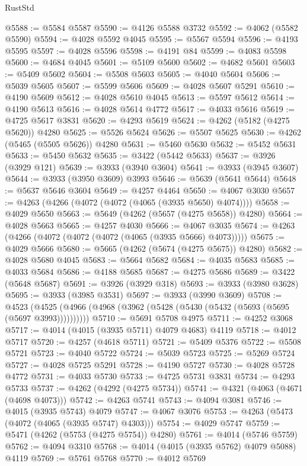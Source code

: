 \begin{lexlean}{RustStd}
\begin{coremodule}
@5588 := @5584 @5587
@5590 := @4126 @5588 @3732
@5592 := @4062 (@5582 @5590)
@5594 := @4028 @5592 @4045
@5595 := @5567 @5594
@5596 := @4193 @5595
@5597 := @4028 @5596
@5598 := @4191 @84
@5599 := @4083 @5598
@5600 := @4684 @4045
@5601 := @5109 @5600
@5602 := @4682 @5601
@5603 := @5409 @5602
@5604 := @5508 @5603
@5605 := @4040 @5604
@5606 := @5039 @5605
@5607 := @5599 @5606
@5609 := @4028 @5607 @5291
@5610 := @4190 @5609
@5612 := @4028 @5610 @4045
@5613 := @5597 @5612
@5614 := @4190 @5613
@5616 := @4028 @5614 @4772
@5617 := @4033 @5616
@5619 := @4725 @5617 @3831
@5620 := @4293 @5619
@5624 := @4262 (@5182 (@4275 @5620)) @4280
@5625 := @5526 @5624
@5626 := @5507 @5625
@5630 := @4262 (@5465 (@5505 @5626)) @4280
@5631 := @5460 @5630
@5632 := @5452 @5631
@5633 := @5450 @5632
@5635 := @3422 (@5442 @5633)
@5637 := @3926 (@3929 @121)
@5639 := @3933 (@3940 @3604)
@5641 := @3933 (@3945 @3607)
@5644 := @3933 (@3950 @3609) @3993
@5646 := @5639 (@5641 @5644)
@5648 := @5637 @5646 @3604
@5649 := @4257 @4464
@5650 := @4067 @3030
@5657 := @4263 (@4266 (@4072 (@4072 (@4065 (@3935 @5650) @4074))))
@5658 := @4029 @5650
@5663 := @5649 (@4262 (@5657 (@4275 @5658)) @4280)
@5664 := @4028 @5663
@5665 := @4257 @4030
@5666 := @4067 @3035
@5674 := @4263 (@4266 (@4072 (@4072 (@4072 (@4065 (@3935 @5666) @4073)))))
@5675 := @4029 @5666
@5680 := @5665 (@4262 (@5674 (@4275 @5675)) @4280)
@5682 := @4028 @5680 @4045
@5683 := @5664 @5682
@5684 := @4035 @5683
@5685 := @4033 @5684
@5686 := @4188 @5685
@5687 := @4275 @5686
@5689 := @3422 (@5648 @5687)
@5691 := @3926 (@3929 @318)
@5693 := @3933 (@3980 @3628)
@5695 := @3933 (@3985 @3531)
@5697 := @3933 (@3990 @3609)
@5708 := @4523 (@4525 (@4966 (@4968 (@3962 (@5428 (@5430 (@5432 (@5693 (@5695 (@5697 @3993))))))))))
@5710 := @5691 @5708 @4975
@5711 := @4252 @3068
@5717 := @4014 (@4015 (@3935 @5711) @4079 @4683) @4119
@5718 := @4012 @5717
@5720 := @4257 (@4618 @5711)
@5721 := @5409 @5376
@5722 := @5508 @5721
@5723 := @4040 @5722
@5724 := @5039 @5723
@5725 := @5269 @5724
@5727 := @4028 @5725 @5291
@5728 := @4190 @5727
@5730 := @4028 @5728 @4772
@5731 := @4033 @5730
@5733 := @4725 @5731 @3831
@5734 := @4293 @5733
@5737 := @4262 (@4292 (@4275 @5734))
@5741 := @4321 (@4063 (@4671 (@4698 @4073)))
@5742 := @4263 @5741
@5743 := @4094 @3081
@5746 := @4015 (@3935 @5743) @4079
@5747 := @4067 @3076
@5753 := @4263 (@5473 (@4072 (@4065 (@3935 @5747) @4303)))
@5754 := @4029 @5747
@5759 := @5471 (@4262 (@5753 (@4275 @5754)) @4280)
@5761 := @4014 (@5746 @5759)
@5762 := @4094 @3310
@5768 := @4014 (@4015 (@3935 @5762) @4079 @5088) @4119
@5769 := @5761 @5768
@5770 := @4012 @5769

\end{coremodule}
\end{lexlean}
